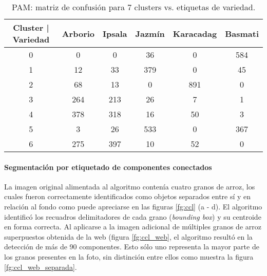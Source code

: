 \documentclass{article}
\begin{document}
\begin{table}
    \centering
    \begin{tabular}{cccccc}
    \toprule
    Cluster | Variedad &  Arborio&  Ipsala&  Jazmín&  Karacadag& Basmati\\
    \midrule
    0 & 0 & 0 & 36 & 0 & 584 \\
    1 & 12 & 33 & 379 & 0 & 45 \\
    2 & 68 & 13 & 0 & 891 & 0 \\
    3 & 264 & 213 & 26 & 7 & 1 \\
    4 & 378 & 318 & 16 & 50 & 3 \\
    5 & 3 & 26 & 533 & 0 & 367 \\
    6 & 275 & 397 & 10 & 52 & 0 \\
    \bottomrule
    \end{tabular}
    \caption{PAM: matriz de confusión para 7 clusters vs. etiquetas de variedad.}
    \label{tab:mc_PAM7}
\end{table}


\paragraph{Segmentación por etiquetado de componentes conectados}

La imagen original alimentada al algoritmo contenía cuatro granos de arroz, los cuales fueron correctamente identificados como objetos separados entre sí y en relación al fondo como puede apreciarse en las figuras \ref{fg:ccl} (a - d).
El algoritmo identificó los recuadros delimitadores de cada grano (\textit{bounding box}) y su centroide en forma correcta.
Al aplicarse a la imagen adicional de múltiples granos de arroz superpuestos obtenida de la web (figura \ref{fg:ccl_web}, el algoritmo resultó en la detección de más de 90 componentes.
Esto sólo uno representa la mayor parte de los granos presentes en la foto, sin distinción entre ellos como muestra la figura \ref{fg:ccl_web_separada}.
\end{document}
